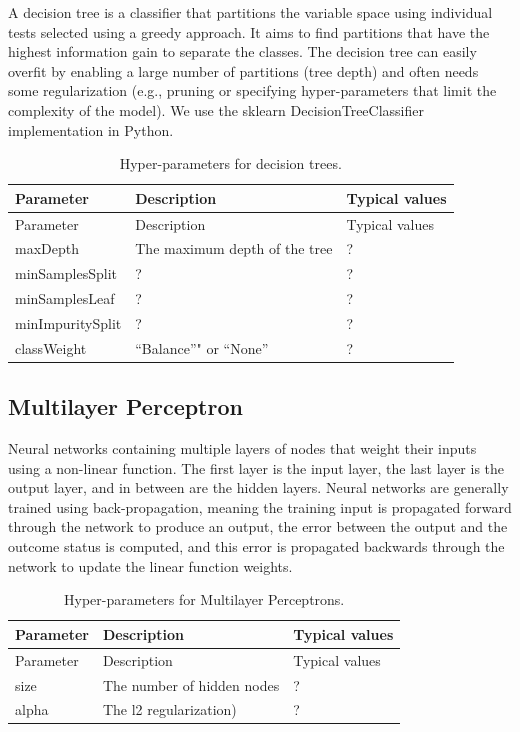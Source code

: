 \documentclass[11pt]{book}
\theoremstyle{definition}
\theoremstyle{definition}
\theoremstyle{definition}
\theoremstyle{remark}
\begin{document}
A decision tree is a classifier that partitions the variable space using individual tests selected using a greedy approach. It aims to find partitions that have the highest information gain to separate the classes. The decision tree can easily overfit by enabling a large number of partitions (tree depth) and often needs some regularization (e.g., pruning or specifying hyper-parameters that limit the complexity of the model). We use the sklearn DecisionTreeClassifier implementation in Python.  

\begin{longtable}[]{@{}lll@{}}
\caption{\label{tab:decisionTreeParameters} Hyper-parameters for decision trees.}\tabularnewline
\toprule
Parameter & Description & Typical values\tabularnewline
\midrule
\endfirsthead
\toprule
Parameter & Description & Typical values\tabularnewline
\midrule
\endhead
maxDepth & The maximum depth of the tree & ?\tabularnewline
minSamplesSplit & ? & ?\tabularnewline
minSamplesLeaf & ? & ?\tabularnewline
minImpuritySplit & ? & ?\tabularnewline
classWeight & ``Balance''" or ``None'' & ?\tabularnewline
\bottomrule
\end{longtable}

\hypertarget{multilayer-perceptron}{%
\subsection{Multilayer Perceptron}\label{multilayer-perceptron}}

Neural networks containing multiple layers of nodes that weight their inputs using a non-linear function. The first layer is the input layer, the last layer is the output layer, and in between are the hidden layers. Neural networks are generally trained using back-propagation, meaning the training input is propagated forward through the network to produce an output, the error between the output and the outcome status is computed, and this error is propagated backwards through the network to update the linear function weights.   

\begin{longtable}[]{@{}lll@{}}
\caption{\label{tab:mpParameters} Hyper-parameters for Multilayer Perceptrons.}\tabularnewline
\toprule
Parameter & Description & Typical values\tabularnewline
\midrule
\endfirsthead
\toprule
Parameter & Description & Typical values\tabularnewline
\midrule
\endhead
size & The number of hidden nodes & ?\tabularnewline
alpha & The l2 regularization) & ?\tabularnewline
\bottomrule
\end{longtable}
\end{document}
